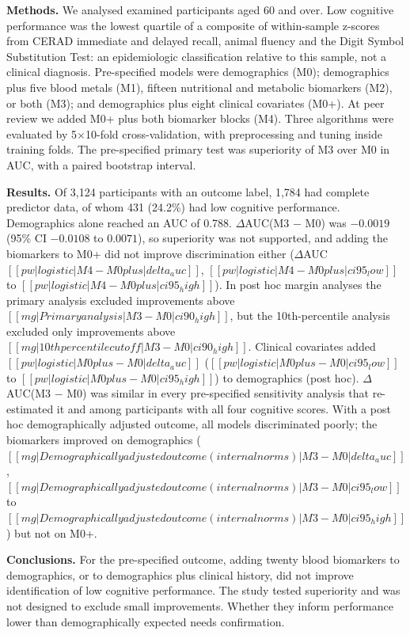 \documentclass[12pt]{article}
\newcommand{\deltaauc}{$\Delta$AUC}
\begin{document}
\textbf{Methods.} We analysed examined participants aged 60 and over. Low cognitive performance was the lowest quartile of a composite of within-sample z-scores from CERAD immediate and delayed recall, animal fluency and the Digit Symbol Substitution Test: an epidemiologic classification relative to this sample, not a clinical diagnosis. Pre-specified models were demographics (M0); demographics plus five blood metals (M1), fifteen nutritional and metabolic biomarkers (M2), or both (M3); and demographics plus eight clinical covariates (M0+). At peer review we added M0+ plus both biomarker blocks (M4). Three algorithms were evaluated by 5$\times$10-fold cross-validation, with preprocessing and tuning inside training folds. The pre-specified primary test was superiority of M3 over M0 in AUC, with a paired bootstrap interval.

\textbf{Results.} Of 3,124 participants with an outcome label, 1,784 had complete predictor data, of whom 431 (24.2\%) had low cognitive performance. Demographics alone reached an AUC of 0.788. \deltaauc(M3 $-$ M0) was $-0.0019$ (95\% CI $-0.0108$ to $0.0071$), so superiority was not supported, and adding the biomarkers to M0+ did not improve discrimination either (\deltaauc\ $[[pw|logistic|M4 - M0plus|delta_auc]]$, $[[pw|logistic|M4 - M0plus|ci95_low]]$ to $[[pw|logistic|M4 - M0plus|ci95_high]]$). In post hoc margin analyses the primary analysis excluded improvements above $[[mg|Primary analysis|M3 - M0|ci90_high]]$, but the 10th-percentile analysis excluded only improvements above $[[mg|10th percentile cutoff|M3 - M0|ci90_high]]$. Clinical covariates added $[[pw|logistic|M0plus - M0|delta_auc]]$ ($[[pw|logistic|M0plus - M0|ci95_low]]$ to $[[pw|logistic|M0plus - M0|ci95_high]]$) to demographics (post hoc). \deltaauc(M3 $-$ M0) was similar in every pre-specified sensitivity analysis that re-estimated it and among participants with all four cognitive scores. With a post hoc demographically adjusted outcome, all models discriminated poorly; the biomarkers improved on demographics ($[[mg|Demographically adjusted outcome (internal norms)|M3 - M0|delta_auc]]$, $[[mg|Demographically adjusted outcome (internal norms)|M3 - M0|ci95_low]]$ to $[[mg|Demographically adjusted outcome (internal norms)|M3 - M0|ci95_high]]$) but not on M0+.

\textbf{Conclusions.} For the pre-specified outcome, adding twenty blood biomarkers to demographics, or to demographics plus clinical history, did not improve identification of low cognitive performance. The study tested superiority and was not designed to exclude small improvements. Whether they inform performance lower than demographically expected needs confirmation.
\end{document}
